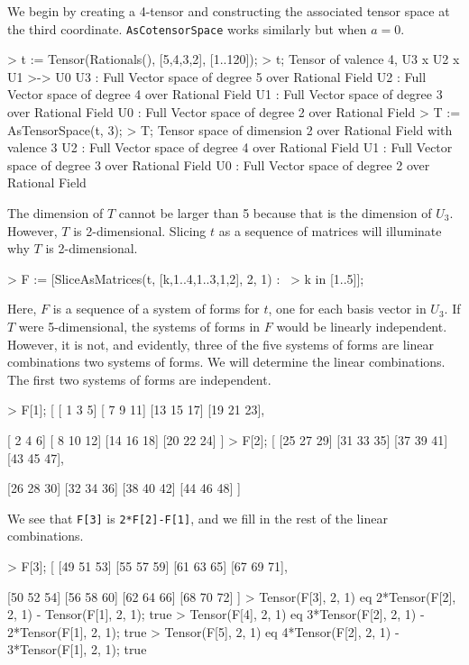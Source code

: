 \begin{example}[TensorsToSpaces]

We begin by creating a 4-tensor and constructing the associated tensor space at the third coordinate.
\texttt{AsCotensorSpace} works similarly but when $a=0$. 
\begin{code}
> t := Tensor(Rationals(), [5,4,3,2], [1..120]);
> t;
Tensor of valence 4, U3 x U2 x U1 >-> U0
U3 : Full Vector space of degree 5 over Rational Field
U2 : Full Vector space of degree 4 over Rational Field
U1 : Full Vector space of degree 3 over Rational Field
U0 : Full Vector space of degree 2 over Rational Field
> T := AsTensorSpace(t, 3);
> T;
Tensor space of dimension 2 over Rational Field with valence 3
U2 : Full Vector space of degree 4 over Rational Field
U1 : Full Vector space of degree 3 over Rational Field
U0 : Full Vector space of degree 2 over Rational Field
\end{code}

The dimension of $T$ cannot be larger than 5 because that is the dimension of $U_3$.
However, $T$ is 2-dimensional. 
Slicing $t$ as a sequence of matrices will illuminate why $T$ is 2-dimensional.
\begin{code}
> F := [SliceAsMatrices(t, [{k},{1..4},{1..3},{1,2}], 2, 1) : \
>     k in [1..5]];
\end{code}

Here, $F$ is a sequence of a system of forms for $t$, one for each basis vector in $U_3$. 
If $T$ were 5-dimensional, the systems of forms in $F$ would be linearly independent. 
However, it is not, and evidently, three of the five systems of forms are linear combinations two systems of forms. 
We will determine the linear combinations.
The first two systems of forms are independent.
\begin{code}
> F[1];
[
    [ 1  3  5]
    [ 7  9 11]
    [13 15 17]
    [19 21 23],

    [ 2  4  6]
    [ 8 10 12]
    [14 16 18]
    [20 22 24]
]
> F[2];
[
    [25 27 29]
    [31 33 35]
    [37 39 41]
    [43 45 47],

    [26 28 30]
    [32 34 36]
    [38 40 42]
    [44 46 48]
]
\end{code}

We see that \texttt{F[3]} is \texttt{2*F[2]-F[1]}, and we fill in the rest of the linear combinations.
\begin{code}
> F[3];
[
    [49 51 53]
    [55 57 59]
    [61 63 65]
    [67 69 71],

    [50 52 54]
    [56 58 60]
    [62 64 66]
    [68 70 72]
]
> Tensor(F[3], 2, 1) eq 2*Tensor(F[2], 2, 1) - Tensor(F[1], 2, 1);
true
> Tensor(F[4], 2, 1) eq 3*Tensor(F[2], 2, 1) - 2*Tensor(F[1], 2, 1);
true
> Tensor(F[5], 2, 1) eq 4*Tensor(F[2], 2, 1) - 3*Tensor(F[1], 2, 1);
true
\end{code}


\end{example}
